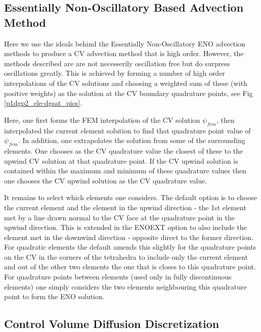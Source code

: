 \subsection{Essentially Non-Oscillatory Based Advection Method}
\label{Essentially Non-Oscillatory Based Advection Method}
Here we use the ideals behind the Essentially Non-Oscillatory ENO advection methods to produce a
CV advection method that is high order. However, the methods described are are not necesserily oscillation
free but do surpress oscillations greatly.
This is achieved by forming a number of high order
interpolations of the CV solutions and choosing a weighted sum of these (with positive weights)
as the solution at the CV boundary quadrature points, see Fig \ref{p1dgp2_ele-dgsat_pics}.

Here, one first forms the FEM interpolation of the
CV solution $\psi_{fem}$, then interpolated the current element
solution to find that quadrature point value of $\psi_{fem}$.
In addition, one extrapolates the solution from some of the surrounding elements.
One chooses as the CV quadrature value the closest of these to the upwind CV solution at that
quadrature point.
If the CV upwind solution is contained within the maximum and minimum of these quadrature values
then one chooses the CV upwind solution as the CV quadrature value.

It remains to select which elements one considers. The default option is
to choose the current element and the element in the upwind direction - the 1st element met by a line drawn
normal to the CV face at the quadrature point in the upwind direction.
This is extended in the ENOEXT option
to also include the element met in the downwind direction - opposite direct to the former direction.
For quadratic elements the default amends this slightly for the quadrature points on the CV
in the corners of the tetrahedra to include only the current element and out of the other two elements the
one that is closes to this quadrature point.
For quadrature points between elements (used only in fully discontinuous elements) one simply considers the two
elements neighbouring this quadrature point to form the ENO solution.




\subsection{Control Volume Diffusion Discretization}
\label{section_diff_discretisation}

